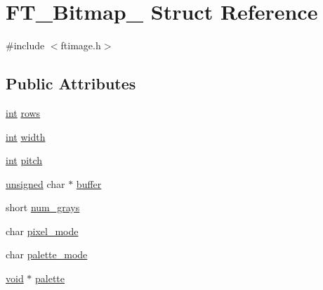 \hypertarget{struct_f_t___bitmap__}{\section{F\-T\-\_\-\-Bitmap\-\_\- Struct Reference}
\label{struct_f_t___bitmap__}
}


{\ttfamily \#include $<$ftimage.\-h$>$}

\subsection*{Public Attributes}
\begin{DoxyCompactItemize}
\item 
\hyperlink{wglew_8h_a500a82aecba06f4550f6849b8099ca21}{int} \hyperlink{struct_f_t___bitmap___a1b6bb20b30fe087e3fc87a0eb37730c0}{rows}
\item 
\hyperlink{wglew_8h_a500a82aecba06f4550f6849b8099ca21}{int} \hyperlink{struct_f_t___bitmap___a7b5e6252dd91a3809fe80ebbeb6720eb}{width}
\item 
\hyperlink{wglew_8h_a500a82aecba06f4550f6849b8099ca21}{int} \hyperlink{struct_f_t___bitmap___afdee595846e1188c7a76d0cec9d85cf2}{pitch}
\item 
\hyperlink{_free_image_8h_a425076c7067a1b5166e2cc530e914814}{unsigned} char $\ast$ \hyperlink{struct_f_t___bitmap___a76439b1d3c13b81ca506108cd1623284}{buffer}
\item 
short \hyperlink{struct_f_t___bitmap___a415d78060f8012d312703c9792ec005a}{num\-\_\-grays}
\item 
char \hyperlink{struct_f_t___bitmap___a5cc5e0fe42a93a86e16706ad52e087a2}{pixel\-\_\-mode}
\item 
char \hyperlink{struct_f_t___bitmap___ae7c8c74255cd27873b12a360cd5f3884}{palette\-\_\-mode}
\item 
\hyperlink{wglew_8h_aeea6e3dfae3acf232096f57d2d57f084}{void} $\ast$ \hyperlink{struct_f_t___bitmap___a8d5ecf4409f71bfb559e0d13d8df4d86}{palette}
\end{DoxyCompactItemize}


